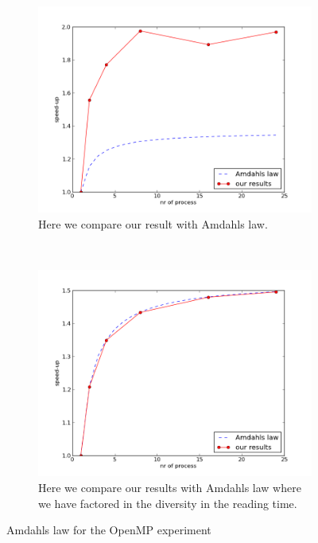 \documentclass[a4paper,10pt]{article}
\begin{document}
\begin{figure}[h!t]
        \centering
        \begin{subfigure}[b]{0.70\textwidth}
                \centering
                \includegraphics[width=\textwidth]{graphics/openmp17gb/Amdahls_law.png}
                \caption{Here we compare our result with Amdahls law.}
                \label{fig:openmp_amad1}
        \end{subfigure}%
        \\
        \begin{subfigure}[b]{0.70\textwidth}
                \centering
                \includegraphics[width=\textwidth]{graphics/openmp17gb/Amdahls_law2.png}
                \caption{Here we compare our results with Amdahls law where we have factored in
                         the diversity in the reading time.}
                \label{fig:openmp_amad2}
        \end{subfigure}
        \caption{Amdahls law for the OpenMP experiment}
\end{figure}
\end{document}
